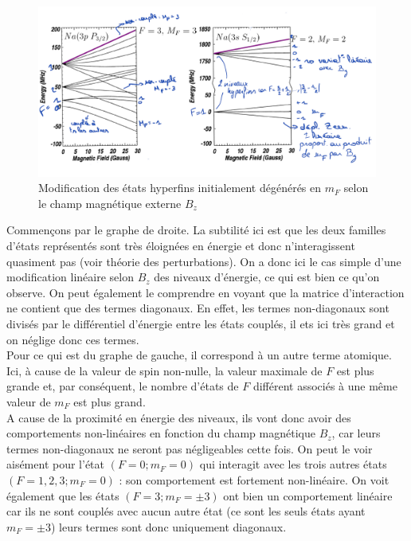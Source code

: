 \begin{figure}[tph]
    \centering
    \includegraphics[width=\textwidth]{Images2/ZeemanHyperfin.PNG}
    \caption{Modification des états hyperfins initialement dégénérés en $m_F$ selon le champ magnétique externe $B_z$}
    \label{fig:Zeeman}
\end{figure}

Commençons par le graphe de droite. La subtilité ici est que les deux familles d'états représentés sont très éloignées en énergie et donc n'interagissent quasiment pas (voir théorie des perturbations). On a donc ici le cas simple d'une modification linéaire selon $B_z$ des niveaux d'énergie, ce qui est bien ce qu'on observe. On peut également le comprendre en voyant que la matrice d'interaction ne contient que des termes diagonaux. En effet, les termes non-diagonaux sont divisés par le différentiel d'énergie entre les états couplés, il ets ici très grand et on néglige donc ces termes.\\

Pour ce qui est du graphe de gauche, il correspond à un autre terme atomique. Ici, à cause de la valeur de spin non-nulle, la valeur maximale de $F$ est plus grande et, par conséquent, le nombre d'états de $F$ différent associés à une même valeur de $m_F$ est plus grand.\\
A cause de la proximité en énergie des niveaux, ils vont donc avoir des comportements non-linéaires en fonction du champ magnétique $B_z$, car leurs termes non-diagonaux ne seront pas négligeables cette fois. On peut le voir aisément pour l'état $(F = 0;m_F = 0)$ qui interagit avec les trois autres états $(F=1,2,3;m_F = 0)$ : son comportement est fortement non-linéaire. On voit également que les états $(F = 3;m_F = \pm3)$ ont bien un comportement linéaire car ils ne sont couplés avec aucun autre état (ce sont les seuls états ayant $m_F=\pm3$) leurs termes sont donc uniquement diagonaux.\\

